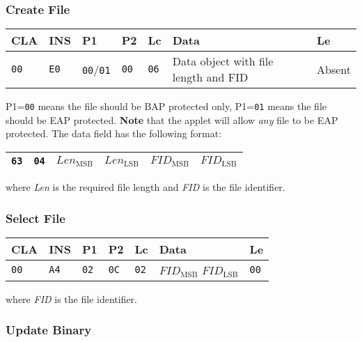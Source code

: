 \documentclass{article}
\begin{document}
\subsubsection{Create File}

\begin{flushleft}
\begin{tabular}{|l|l|l|l|l|l|l|}
\hline
CLA & INS & P1 & P2 & Lc & Data & Le \\
\hline
\texttt{00} & \texttt{E0} & \texttt{00}/\texttt{01} & \texttt{00} &
\texttt{06} & Data object with file length and FID  & Absent \\
\hline
\end{tabular}
\end{flushleft}
P1=\texttt{00} means the file should be BAP protected only,
P1=\texttt{01} means the file should be EAP protected. 
\textbf{Note} that the applet will allow \textit{any} file to be EAP protected.
The data field
has the following format:
\begin{flushleft}
\begin{tabular}{|l|l|l|l|l|l|}
\hline
\texttt{63} & \texttt{04} &
$\mathit{Len}_{\mathrm{MSB}}$ & $\mathit{Len}_{\mathrm{LSB}}$ &
$\mathit{FID}_{\mathrm{MSB}}$ & $\mathit{FID}_{\mathrm{LSB}}$ \\
\hline
\end{tabular}
\end{flushleft}
where \textit{Len} is the required file length and \textit{FID} is the
file identifier.

\subsubsection{Select File}

\begin{flushleft}
\begin{tabular}{|l|l|l|l|l|l|l|}
\hline
CLA & INS & P1 & P2 & Lc & Data & Le \\
\hline
\texttt{00} & \texttt{A4} & \texttt{02} & \texttt{0C} & \texttt{02} &
$\mathit{FID}_{\mathrm{MSB}}$ $\mathit{FID}_{\mathrm{LSB}}$ & \texttt{00} \\
\hline
\end{tabular}
\end{flushleft}
where \textit{FID} is the file identifier.

\subsubsection{Update Binary}
\end{document}

